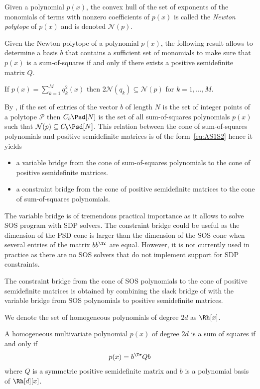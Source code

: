 \documentclass[11pt,twoside,a4paper,openright]{uclouvain-thesis}
\begin{document}
\begin{mydef}
  Given a polynomial $p(x)$, the convex hull of the set of exponents of the monomials of terms with nonzero coefficients of $p(x)$ is called the \emph{Newton polytope} of $p(x)$
  and is denoted $\mathcal{N}(p)$.
\end{mydef}

Given the Newton polytope of a polynomial $p(x)$,
the following result allows to determine a basis $b$ that contains
a sufficient set of monomials to make sure that $p(x)$ is a sum-of-squares
if and only if there exists a positive semidefinite matrix $Q$.

\begin{mytheo}
  \label{theo:newton}
  If $p(x) = \sum_{k=1}^M q_k^2(x)$ then $2\mathcal{N}(q_k) \subseteq \mathcal{N}(p)$ for $k = 1, \ldots, M$.
\end{mytheo}

By , if the set of entries of the vector $b$ of length $N$ is the set of integer points of a polytope $\mathcal{P}$ then $C_b \Psd[N]$ is the set
of all sum-of-squares polynomials $p(x)$ such that $\mathcal{N}(p) \subseteq C_b \Psd[N]$.
This relation between the cone of sum-of-squares polynomials and positive semidefinite matrices is of the form~\eqref{eq:AS1S2} hence
it yields
\begin{itemize}
  \item a variable bridge from the cone of sum-of-squares polynomials
    to the cone of positive semidefinite matrices.
  \item a constraint bridge from the cone of positive semidefinite matrices
    to the cone of sum-of-squares polynomials.
\end{itemize}
The variable bridge is of tremendous practical importance as it allows to
solve SOS program with SDP solvers.
The constraint bridge could be useful as the dimension of the PSD cone
is larger than the dimension of the SOS cone when several entries of the matrix $bb^\Tr$
are equal.
However, it is not currently used in practice as there are no SOS solvers
that do not implement support for SDP constraints.

The constraint bridge from the cone of SOS polynomials to the cone of
positive semidefinite matrices is obtained by combining the slack bridge of 
with the variable bridge from SOS polynomials to positive semidefinite matrices.

We denote the set of homogeneous polynomials of degree $2d$ as ${\Rh}[x]$.
\begin{mycoro}
  \label{coro:hsos}
  A homogeneous multivariate polynomial $p(x)$ of degree $2d$ is a sum
  of squares if and only if
  \[ p(x) = b^\Tr Q b \]
  where $Q$ is a symmetric positive semidefinite matrix
  and $b$ is a polynomial basis of ${\Rh[d]}[x]$.
\end{mycoro}
\end{document}
